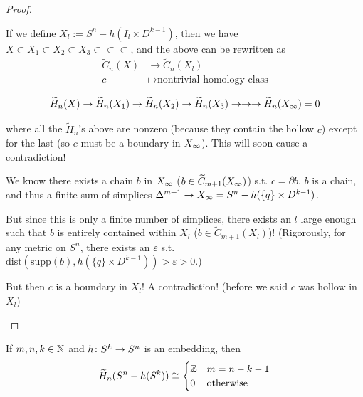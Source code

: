 \documentclass[11pt,leqno,oneside]{amsart}
\numberwithin{thm}{section}
\renewcommand{\epsilon}{\varepsilon}
\renewcommand{\d}{\partial}
\newcommand{\rhoml}[1][n]{\widetilde{H}_{#1}}
\newcommand{\rchains}[1][n]{\widetilde{C}_{#1}}
\newcommand{\x}{\times}
\begin{document}
\begin{proof}
\begin{itemize}
    If we define $X_l := S^n - h(I_l \x D^{k-1})$, then we have $X \subset X_1 \subset X_2 \subset X_3 \subset \subset \subset$, and the above can be rewritten as
    \begin{align*}
      \rchains(X) &\to \rchains(X_l) \\
      c &\mapsto \text{nontrivial homology class}
    \end{align*}

    $$\rhoml(X) \to \rhoml(X_1) \to \rhoml(X_2) \to \rhoml(X_3) \to \to \to \rhoml(X_\oo) = 0$$

    where all the $\rhoml$'s above are nonzero (because they contain the hollow $c$) except for the last (so $c$ must be a boundary in $X_\infty$).  This will soon cause a contradiction!

    We know there exists a chain $b$ in $X_\infty$ ($b \in \rchains[m+1](X_\oo)$) s.t. $c = \d b$.  $b$ is a chain, and thus a finite sum of simplices $\Delta^{m+1} \to X_\oo = S^n - h(\{q\} \x D^{k-1})$.

    But since this is only a finite number of simplices, there exists an $l$ large enough such that $b$ is entirely contained within $X_l$ ($b \in \rchains[m+1](X_l)$)!  (Rigorously, for any metric on $S^n$, there exists an $\epsilon$ s.t. $\text{dist}(\text{supp}(b), h(\{q\} \x D^{k-1})) > \epsilon > 0$.)

    But then $c$ is a boundary in $X_l$!  A contradiction! (before we said $c$ was hollow in $X_l$)
  \end{itemize}
\end{proof}
\begin{cor}
  If $m, n, k \in {\mathbb N}$ and $h \colon S^k \to S^n$ is an embedding, then
  $$\rhoml(S^n - h(S^k)) \isom \begin{cases}
    \Z &\text{$m = n - k - 1$} \\
    0 &\text{otherwise}
  \end{cases}$$
\end{cor}
\end{document}

